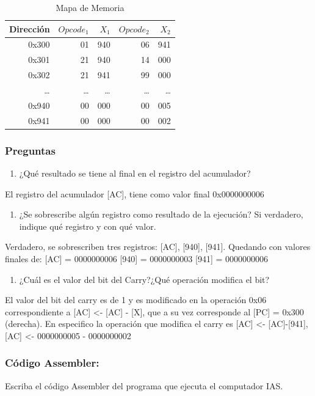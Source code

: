 \documentclass{article}
\begin{document}
\begin{table}[htbp]
\caption{\label{tab:org91fa3c3}Mapa de Memoria}
\centering
\begin{tabular}{rrrrr}
\hline
Dirección & \(Opcode_1\) & \(X_1\) & \(Opcode_2\) & \(X_2\)\\
\hline
0x300 & 01 & 940 & 06 & 941\\
0x301 & 21 & 940 & 14 & 000\\
0x302 & 21 & 941 & 99 & 000\\
\ldots{} & \ldots{} & \ldots{} & \ldots{} & \ldots{}\\
0x940 & 00 & 000 & 00 & 005\\
0x941 & 00 & 000 & 00 & 002\\
\hline
\end{tabular}
\end{table}
\subsubsection{Preguntas}
\label{sec:org3976f72}
\begin{enumerate}
\item ¿Qué resultado se tiene al final en el registro del acumulador?
\end{enumerate}
El registro del acumulador [AC], tiene como valor final 0x0000000006
\begin{enumerate}
\item ¿Se sobrescribe algún registro como resultado de la ejecución? Si
verdadero, indique qué registro y con qué valor.
\end{enumerate}
Verdadero, se sobrescriben tres registros: [AC], [940],
   {[}941]. Quedando con valores finales de:
   {[}AC] = 0000000006
   {[}940] = 0000000003
   {[}941] = 0000000006

\begin{enumerate}
\item ¿Cuál es el valor del bit del Carry?¿Qué operación modifica el bit?
\end{enumerate}
El valor del bit del carry es de 1 y es modificado en la operación
0x06 correspondiente a [AC] <- [AC] - [X], que a su vez corresponde al
{[}PC] = 0x300 (derecha). En especifico la operación que modifica el
carry es [AC] <- [AC]-[941], [AC] <- 0000000005 - 0000000002
\subsubsection{Código Assembler:}
\label{sec:org234973a}
Escriba el código Assembler del programa que ejecuta el computador IAS.
\end{document}
